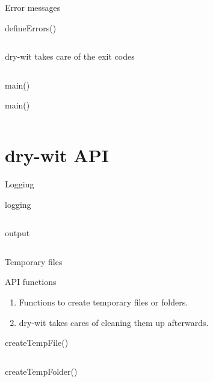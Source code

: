 \documentclass{beamer}
\begin{document}
\begin{frame}[fragile]{Error messages}
  \begin{block}{defineErrors()}
    \inputminted[breaklines,fontsize=\tiny]{bash}{defineerrors.bash}
  \end{block}
  \begin{block}{dry-wit takes care of the exit codes}
    \inputminted{bash}{exitwitherrorcode.bash}
  \end{block}
\end{frame}

\begin{frame}[fragile]{main()}
  \begin{block}{main()}
    \inputminted{bash}{main.bash}
  \end{block}
\end{frame}

\section{dry-wit API}

\begin{frame}[fragile]{Logging}
  \begin{block}{logging}
    \inputminted{bash}{logging.bash}
  \end{block}
  \begin{block}{output}
    \inputminted[breaklines,fontsize=\tiny]{bash}{logging-output.bash}
  \end{block}
\end{frame}

\begin{frame}[fragile]{Temporary files}
  \begin{block}{API functions}
    \begin{enumerate}
    \item Functions to create temporary files or folders.
    \item dry-wit takes cares of cleaning them up afterwards.
    \end{enumerate}
  \end{block}
  \begin{block}{createTempFile()}
    \inputminted{bash}{createtempfile.bash}
  \end{block}
  \begin{block}{createTempFolder()}
    \inputminted{bash}{createtempfolder.bash}
  \end{block}
\end{frame}
\end{document}
